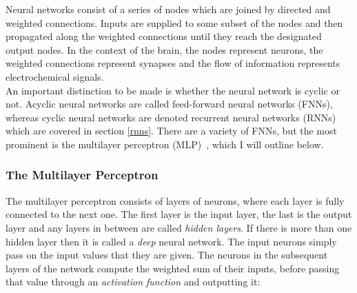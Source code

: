 \documentclass[a4paper, 12pt]{report}
\newcommand{\tit}[1]{\textit{#1}}
\begin{document}
Neural networks consist of a series of nodes which are joined by directed and weighted connections. Inputs are supplied to some subset of the nodes and then propagated along the weighted connections until they reach the designated output nodes. In the context of the brain, the nodes represent neurons, the weighted connections represent synapses and the flow of information represents electrochemical signals. \\

An important distinction to be made is whether the neural network is cyclic or not. Acyclic neural networks are called feed-forward neural networks (FNNs), whereas cyclic neural networks are denoted recurrent neural networks (RNNs) which are covered in section \ref{rnns}. There are a variety of FNNs, but the most prominent is the multilayer perceptron (MLP)~\cite{backprop:rumelhart1985}, which I will outline below. \\

\subsubsection{The Multilayer Perceptron}

The multilayer perceptron consists of layers of neurons, where each layer is fully connected to the next one. The first layer is the input layer, the last is the output layer and any layers in between are called \tit{hidden layers}. If there is more than one hidden layer then it is called a \tit{deep} neural network. The input neurons simply pass on the input values that they are given. The neurons in the subsequent layers of the network compute the weighted sum of their inputs, before passing that value through an \tit{activation function} and outputting it:
\end{document}
